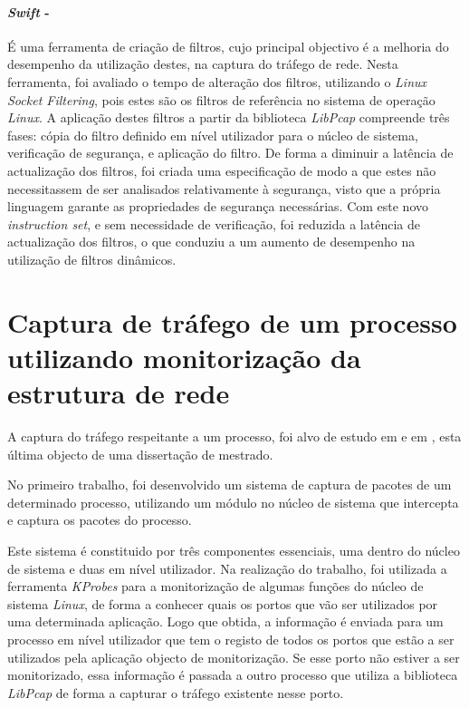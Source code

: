 \paragraph*{\textit{Swift} - }
É uma ferramenta de criação de filtros, cujo principal objectivo é a melhoria do desempenho da utilização destes, na captura do tráfego de rede.
Nesta ferramenta, foi avaliado o tempo de alteração dos filtros, utilizando o \textit{Linux Socket Filtering}, pois estes são os filtros de referência no sistema de operação \textit{Linux}.
A aplicação destes filtros a partir da biblioteca \textit{LibPcap} compreende três fases: cópia do filtro definido em nível utilizador para o núcleo de sistema, verificação de segurança, e aplicação do filtro.
De forma a diminuir a latência de actualização dos filtros, foi criada uma especificação de modo a que estes não necessitassem de ser analisados relativamente à segurança, visto que a própria linguagem garante as propriedades de segurança necessárias.
Com este novo \textit{instruction set}, e sem necessidade de verificação, foi reduzida a latência de actualização dos filtros, o que conduziu a um aumento de desempenho na utilização de filtros dinâmicos.

\section{Captura de tráfego de um processo utilizando monitorização da estrutura de rede}
\label{sect:outras_abordagens}

A captura do tráfego respeitante a um processo, foi alvo de estudo em \cite{1688981} e em \cite{Farruca:2009}, esta última objecto de uma dissertação de mestrado.

No primeiro trabalho, foi desenvolvido um sistema de captura de pacotes de um determinado processo, utilizando um módulo no núcleo de sistema que intercepta e captura os pacotes do processo.

Este sistema é constituido por três componentes essenciais, uma dentro do núcleo de sistema e duas em nível utilizador.
Na realização do trabalho, foi utilizada a ferramenta \textit{KProbes} para a monitorização de algumas funções do núcleo de sistema \textit{Linux}, de forma a conhecer quais os portos que vão ser utilizados por uma determinada aplicação.
Logo que obtida, a informação é enviada para um processo em nível utilizador que tem o registo de todos os portos que estão a ser utilizados pela aplicação objecto de monitorização.
Se esse porto não estiver a ser monitorizado, essa informação é passada a outro processo que utiliza a biblioteca \textit{LibPcap} de forma a capturar o tráfego existente nesse porto.


